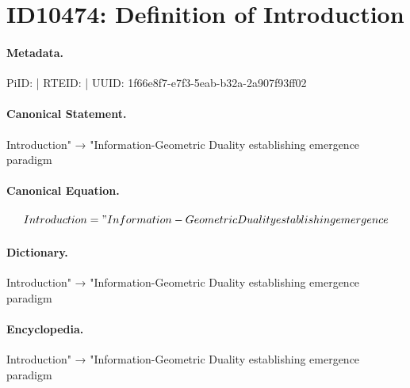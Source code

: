 \section*{ID10474: Definition of Introduction}
\paragraph{Metadata.}
PiID:  | RTEID:  | UUID: 1f66e8f7-e7f3-5eab-b32a-2a907f93ff02

\paragraph{Canonical Statement.}
Introduction" → "Information-Geometric Duality establishing emergence paradigm

\paragraph{Canonical Equation.}
\[
Introduction = "Information-Geometric Duality establishing emergence
\]

\paragraph{Dictionary.}
Introduction" → "Information-Geometric Duality establishing emergence paradigm

\paragraph{Encyclopedia.}
Introduction" → "Information-Geometric Duality establishing emergence paradigm
